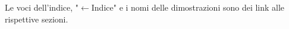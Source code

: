\documentclass[12pt,a4paper]{article}
\begin{document}
	\maketitle\thispagestyle{empty}
	\begin{center}
		\tiny Le voci dell'indice, "$\leftarrow$Indice" e i nomi delle dimostrazioni sono dei link alle rispettive sezioni.
	\end{center}
	\tableofcontents\label{toc}

%	
%	
	
\end{document}
